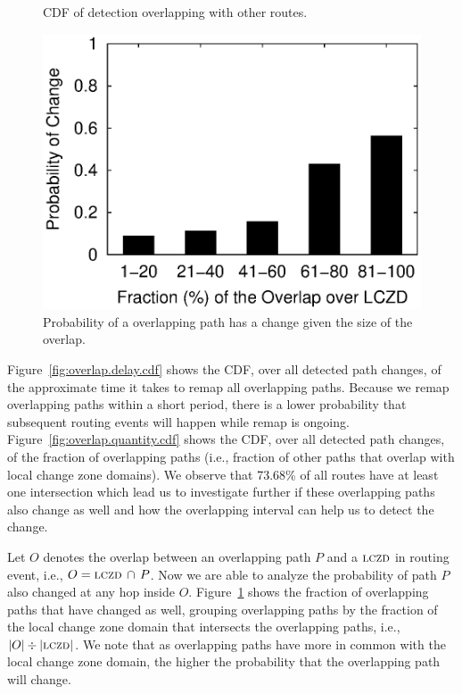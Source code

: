 \begin{figure}
\begin{minipage}{0.32\textwidth}
\caption{CDF of detection overlapping with other routes.}
\label{fig:overlap.quantity.cdf}
\end{minipage}
%
\hfill
\begin{minipage}{0.32\textwidth}
\includegraphics[width=1.05\columnwidth]{figs/patching/probchange/probchange.eps}
\caption{Probability of a overlapping path has a change given the size of the overlap.}
\label{fig:overlap.change.prob}
\end{minipage}
\end{figure}


Figure~\ref{fig:overlap.delay.cdf} shows the CDF, over all detected
path changes, of the approximate time it takes to remap all
overlapping paths.  Because we remap overlapping paths within
a short period, there is a lower probability that subsequent routing
events will happen while remap is ongoing. 
Figure~\ref{fig:overlap.quantity.cdf} shows the CDF, over all
detected path changes, of the fraction of overlapping paths (i.e.,
fraction of other paths that overlap with local change zone
domains).  We observe that 73.68\% of all routes have at least one 
intersection which lead us to investigate further if these
overlapping paths also change as well and how the overlapping
interval can help us to detect the change.


Let $O$ denotes the overlap between an overlapping path $P$ and a $\mathrm{\textsc{lczd}}$ in routing event, i.e.,
$O = \mathrm{\textsc{lczd}}\,\cap\,P$. Now we are able to analyze the probability of path $P$ 
also changed at any hop inside $O$. Figure~\ref{fig:overlap.change.prob} shows
the fraction of overlapping paths that have changed as well, grouping
overlapping paths by the fraction of the local change zone domain
that intersects the overlapping paths, i.e.,
$|O|\div|\mathrm{\textsc{lczd}}|$.  We note that as overlapping paths
have more in common with the local change zone domain, the higher
the probability that the overlapping path will change. 

